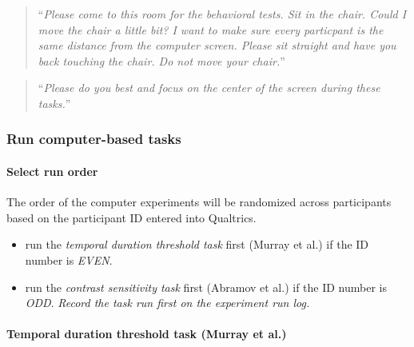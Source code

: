 \documentclass[]{article}
\providecommand{\tightlist}{%
  \setlength{\itemsep}{0pt}\setlength{\parskip}{0pt}}
\let\oldparagraph\paragraph
\renewcommand{\paragraph}[1]{\oldparagraph{#1}\mbox{}}
\begin{document}
\begin{quote}
``\emph{Please come to this room for the behavioral tests. Sit in the
chair. Could I move the chair a little bit? I want to make sure every
particpant is the same distance from the computer screen. Please sit
straight and have you back touching the chair. Do not move your
chair.}''
\end{quote}

\begin{quote}
``\emph{Please do you best and focus on the center of the screen during
these tasks.}''
\end{quote}

\subsubsection{Run computer-based tasks}\label{run-computer-based-tasks}

\paragraph{Select run order}\label{select-run-order}

The order of the computer experiments will be randomized across
participants based on the participant ID entered into Qualtrics.

\begin{itemize}
\tightlist
\item
  run the \emph{temporal duration threshold task} first (Murray et al.)
  if the ID number is \emph{EVEN}.
\item
  run the \emph{contrast sensitivity task} first (Abramov et al.) if the
  ID number is \emph{ODD}. \emph{Record the task run first on the
  experiment run log.}
\end{itemize}

\paragraph{Temporal duration threshold task (Murray et
al.)}\label{temporal-duration-threshold-task-murray-et-al.}
\end{document}

